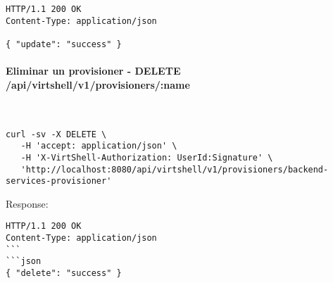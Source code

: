 \begin{lstlisting}[style=json]
HTTP/1.1 200 OK
Content-Type: application/json

{ "update": "success" }
\end{lstlisting}

\paragraph{Eliminar un provisioner - DELETE /api/virtshell/v1/provisioners/:name} ~\\

\begin{lstlisting}[style=json]
curl -sv -X DELETE \
   -H 'accept: application/json' \
   -H 'X-VirtShell-Authorization: UserId:Signature' \
   'http://localhost:8080/api/virtshell/v1/provisioners/backend-services-provisioner'
\end{lstlisting}

Response:

\begin{lstlisting}[style=json]
HTTP/1.1 200 OK
Content-Type: application/json
```
```json
{ "delete": "success" }
\end{lstlisting}
